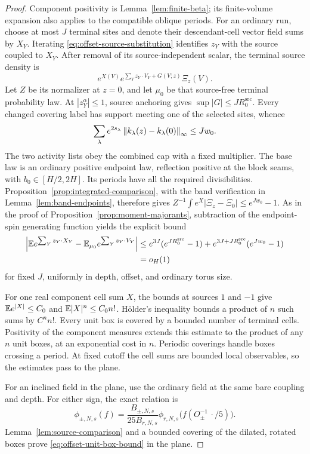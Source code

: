 \begin{proof}
Component positivity is Lemma~\ref{lem:finite-beta}; its finite-volume
expansion also applies to the compatible oblique periods.
For an ordinary run, choose at most $J$ terminal sites and denote their
descendant-cell vector field sums by $X_Y$.  Iterating
\eqref{eq:offset-source-substitution} identifies $z_Y$ with the source
coupled to $X_Y$.  After removal of its source-independent scalar, the
terminal source density is
\[
 e^{X(V)}e^{\sum_Yz_Y\cdot V_Y+G(V;z)}\Xi_z(V).
\]
Let $Z$ be its normalizer at $z=0$, and let $\mu_0$ be that source-free
terminal probability law.  At $|z_Y^\alpha|\le1$, source anchoring gives
$\sup|G|\le JR_0^{\mathrm{src}}$.  Every changed covering label has
support meeting one of the selected sites, whence
\[
 \sum_\lambda e^{2s_\lambda}
       \left\lVert k_\lambda(z)-k_\lambda(0)\right\rVert_\infty\le Jw_0.
\]
The two activity lists obey the combined cap with a fixed multiplier.
The base law is an ordinary positive endpoint law, reflection positive
at the block seams, with $b_0\in[H/2,2H]$.  Its periods have all the
required divisibilities.  Proposition~\ref{prop:integrated-comparison},
with the band verification in Lemma~\ref{lem:band-endpoints},
therefore gives
$Z^{-1}\int e^X|\Xi_z-\Xi_0|\le e^{Jw_0}-1$.
As in the proof of Proposition~\ref{prop:moment-majorants}, subtraction
of the endpoint-spin generating function yields the explicit bound
\begin{align}
 \left|\mathbb E e^{\sum_Yz_Y\cdot X_Y}
       -\mathbb E_{\mu_0}e^{\sum_Yz_Y\cdot V_Y}\right|
 &\le e^{3J}(e^{JR_0^{\mathrm{src}}}-1)
       +e^{3J+JR_0^{\mathrm{src}}}(e^{Jw_0}-1)\notag\\
 &=o_H(1)
 \label{eq:offset-local-source-bound}
\end{align}
for fixed $J$, uniformly in depth, offset, and ordinary torus size.

For one real component cell sum $X$, the bounds at sources $1$ and $-1$
give $\mathbb E e^{|X|}\le C_0$ and $\mathbb E|X|^n\le C_0n!$.  H\"older's
inequality bounds a product of $n$ such sums by $C^nn!$.  Every unit box
is covered by a bounded number of terminal cells.  Positivity of the
component measures extends this estimate to the product of any $n$
unit boxes, at an exponential cost in $n$.  Periodic coverings handle
boxes crossing a period.  At fixed cutoff the cell sums are bounded
local observables, so the estimates pass to the plane.

For an inclined field in the plane, use the ordinary field at the same
bare coupling and depth.  For either sign, the exact relation is
\[
 \phi_{\pm,N,s}(f)
 =\frac{B_{\pm,N,s}}{25B_{r,N,s}}
       \phi_{r,N,s}\bigl(f(O_\pm^{-1}\,\cdot/5)\bigr).
\]
Lemma~\ref{lem:source-comparison} and a bounded covering of the dilated,
rotated boxes prove \eqref{eq:offset-unit-box-bound} in the plane.


\end{proof}
